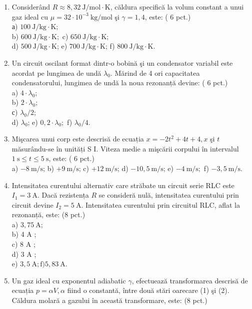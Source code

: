
\begin{enumerate}
  \item Considerând $R \approx 8,32 \mathrm{~J} / \mathrm{mol} \cdot \mathrm{K}$, căldura specifică la volum constant a unui gaz ideal cu $\mu=32 \cdot 10^{-3} \mathrm{~kg} / \mathrm{mol}$ şi $\gamma=1,4$, este: ( 6 pct.)\\
а) $100 \mathrm{~J} / \mathrm{kg} \cdot \mathrm{K}$;\\
b) $600 \mathrm{~J} / \mathrm{kg} \cdot \mathrm{K} ;$ c) $650 \mathrm{~J} / \mathrm{kg} \cdot \mathrm{K}$;\\
d) $500 \mathrm{~J} / \mathrm{kg} \cdot \mathrm{K}$; e) $700 \mathrm{~J} / \mathrm{kg} \cdot \mathrm{K}$; f) $800 \mathrm{~J} / \mathrm{kg} \cdot \mathrm{K}$.
  \item Un circuit oscilant format dintr-o bobină şi un condensator variabil este acordat pe lungimea de undă $\lambda_{0}$. Mărind de 4 ori capacitatea condensatorului, lungimea de undă la noua rezonanță devine: ( 6 pct.)\\
a) $4 \cdot \lambda_{0}$;\\
b) $2 \cdot \lambda_{0}$;\\
с) $\lambda_{0} / 2$;\\
d) $\lambda_{0}$; e) $0,2 \cdot \lambda_{0} ;$ f) $\lambda_{0} / 4$.
  \item Mişcarea unui corp este descrisă de ecuația $x=-2 t^{2}+4 t+4, x$ şi $t$ măsurându-se în unități S I. Viteza medie a mişcării corpului în intervalul $1 \mathrm{~s} \leq t \leq 5 \mathrm{~s}$, este: ( 6 pct.)\\
a) $-8 \mathrm{~m} / \mathrm{s}$; b) $+9 \mathrm{~m} / \mathrm{s}$; c) $+12 \mathrm{~m} / \mathrm{s}$; d) $-10,5 \mathrm{~m} / \mathrm{s}$; e) $-4 \mathrm{~m} / \mathrm{s} ;$ f) $-3,5 \mathrm{~m} / \mathrm{s}$.
  \item Intensitatea curentului alternativ care străbate un circuit serie RLC este $I_{1}=3 \mathrm{~A}$. Dacă rezistența $R$ se consideră nulă, intensitatea curentului prin circuit devine $I_{2}=5 \mathrm{~A}$. Intensitatea curentului prin circuitul RLC, aflat la rezonanță, este: (8 pct.)\\
a) $3,75 \mathrm{~A}$;\\
b) 4 A ;\\
c) 8 A ;\\
d) 3 A ;\\
e) $3,5 \mathrm{~A} ; \mathrm{f}) 5,83 \mathrm{~A}$.
  \item Un gaz ideal cu exponentul adiabatic $\gamma$, efectuează transformarea descrisă de ecuația $p=\alpha V, \alpha$ fiind o constantă, între două stări oarecare (1) şi (2). Căldura molară a gazului în această transformare, este: (8 pct.)\\

\end{enumerate}
